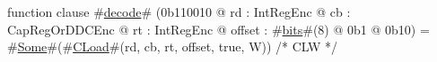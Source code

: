 function clause #\hyperref[zdecode]{decode}# (0b110010 @ rd : IntRegEnc @ cb : CapRegOrDDCEnc @ rt : IntRegEnc @ offset : #\hyperref[zbits]{bits}#(8) @ 0b1 @ 0b10) = #\hyperref[zSome]{Some}#(#\hyperref[zCLoad]{CLoad}#(rd, cb, rt, offset, true,  W)) /* CLW */
